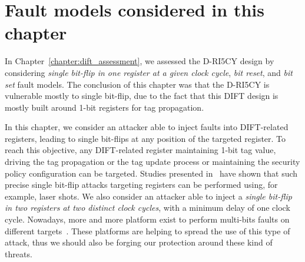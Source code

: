 \section{Fault models considered in this chapter}
In Chapter~\ref{chapter:dift_assessment}, we assessed the D-RI5CY design by considering \textit{single bit-flip in one register at a given clock cycle}, \textit{bit reset}, and \textit{bit set} fault models. The conclusion of this chapter was that the D-RI5CY is vulnerable mostly to single bit-flip, due to the fact that this DIFT design is mostly built around 1-bit registers for tag propagation.

In this chapter, we consider an attacker able to inject faults into DIFT-related registers, leading to single bit-flips at any position of the targeted register. To reach this objective, any DIFT-related register maintaining 1-bit tag value, driving the tag propagation or the tag update process or maintaining the security policy configuration can be targeted. Studies presented in~\cite{ZDCRT-12-dcis,CLFT-14-cosade} have shown that such precise single bit-flip attacks targeting registers can be performed using, for example, laser shots. We also consider an attacker able to inject a \textit{single bit-flip in two registers at two distinct clock cycles}, with a minimum delay of one clock cycle. Nowadays, more and more platform exist to perform multi-bits faults on different targets~\cite{alphanov-doubleLFI,alphanov-fourLFI}. These platforms are helping to spread the use of this type of attack, thus we should also be forging our protection around these kind of threats.

